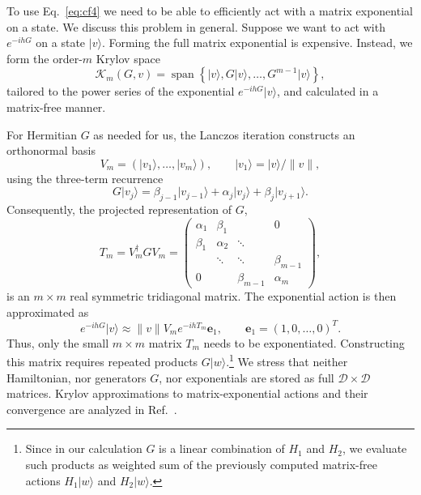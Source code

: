 \documentclass[a4paper,11pt]{article}
\theoremstyle{remark}
\theoremstyle{theorem}
\begin{document}
To use Eq.~\eqref{eq:cf4} we need to be able to efficiently act with a matrix exponential on a state. We discuss this problem in general. Suppose we want to act with $e^{-i h G}$ on a state $|v\rangle$. Forming the full matrix exponential is expensive.
Instead, we form the order-$m$ Krylov space
\begin{equation}
\mathcal K_m(G,v)=\operatorname{span}\left\{
\vert v\rangle,G\vert v\rangle,\ldots,G^{m-1}\vert v\rangle
\right\},
\label{eq:krylovspace}
\end{equation}
tailored to the power series of the exponential $e^{-i h G}\vert v\rangle$, and calculated in a matrix-free manner. 

For Hermitian $G$ as needed for us, the Lanczos iteration constructs an orthonormal basis
\begin{equation}
V_m=(\vert v_1\rangle,\ldots,\vert v_m\rangle),
\qquad
\vert v_1\rangle={\vert v\rangle}/{\lVert v\rVert},
\end{equation}
using the three-term recurrence \cite{Lanczos1950}
\begin{equation}
G\vert v_j\rangle
=\beta_{j-1}\vert v_{j-1}\rangle
+\alpha_j\vert v_j\rangle
+\beta_j\vert v_{j+1}\rangle.
\label{eq:lanczosrecurrence}
\end{equation}
Consequently, the projected representation of $G$,
\begin{equation}
T_m=V_m^\dagger G V_m
=
\begin{pmatrix}
\alpha_1&\beta_1&&0\\
\beta_1&\alpha_2&\ddots&\\
&\ddots&\ddots&\beta_{m-1}\\
0&&\beta_{m-1}&\alpha_m
\end{pmatrix},
\label{eq:tridiagonal}
\end{equation}
is an $m\times m$ real symmetric tridiagonal matrix. 
The exponential action is then approximated as \cite{HochbruckLubich1997}
\begin{equation}
e^{-i h G}\vert v\rangle
\approx 
\lVert v\rVert V_m e^{-i h T_m} \mathbf e_1,
\qquad
\mathbf e_1=(1,0,\ldots,0)^T.
\label{eq:krylovexp}
\end{equation}
Thus, only the small $m\times m$ matrix $T_m$ needs to be exponentiated.  Constructing this matrix requires repeated products $G\vert w\rangle$.\footnote{Since in our calculation $G$ is a linear combination of $H_1$ and $H_2$, we evaluate such products as weighted sum of the previously computed matrix-free actions $H_1\vert w\rangle$ and $H_2\vert w\rangle$.} We stress that neither Hamiltonian, nor generators $G$, nor exponentials are stored as full $\mathcal{D}\times \mathcal{D}$ matrices.  Krylov approximations to matrix-exponential actions and their convergence are analyzed in Ref.~\cite{HochbruckLubich1997}.
\end{document}
